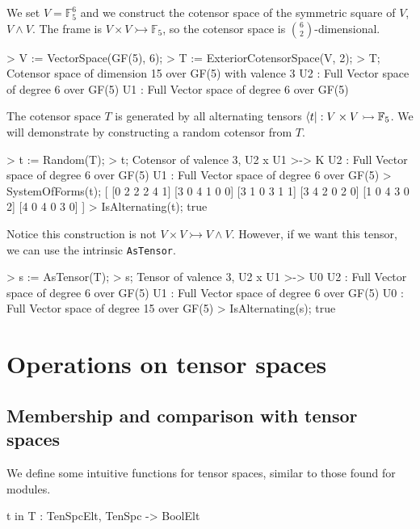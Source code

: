 \begin{example}[StandardCoTenSubspcs]

We set $V=\mathbb{F}_5^6$ and we construct the cotensor space of the symmetric square of $V$, $V\wedge V$. 
The frame is $V\times V\rightarrowtail \mathbb{F}_5$, so the cotensor space is $\binom{6}{2}$-dimensional. 
\begin{code}
> V := VectorSpace(GF(5), 6);
> T := ExteriorCotensorSpace(V, 2);
> T;
Cotensor space of dimension 15 over GF(5) with valence 3
U2 : Full Vector space of degree 6 over GF(5)
U1 : Full Vector space of degree 6 over GF(5)
\end{code}

The cotensor space $T$ is generated by all alternating tensors $\langle t| : V\times V\rightarrowtail \mathbb{F}_5$.
We will demonstrate by constructing a random cotensor from $T$. 
\begin{code}
> t := Random(T);
> t;
Cotensor of valence 3, U2 x U1 >-> K
U2 : Full Vector space of degree 6 over GF(5)
U1 : Full Vector space of degree 6 over GF(5)
> SystemOfForms(t);
[
    [0 2 2 2 4 1]
    [3 0 4 1 0 0]
    [3 1 0 3 1 1]
    [3 4 2 0 2 0]
    [1 0 4 3 0 2]
    [4 0 4 0 3 0]
]
> IsAlternating(t);
true
\end{code}

Notice this construction is not $V\times V\rightarrowtail V\wedge V$. 
However, if we want this tensor, we can use the intrinsic \texttt{AsTensor}.
\begin{code}
> s := AsTensor(T);
> s;
Tensor of valence 3, U2 x U1 >-> U0
U2 : Full Vector space of degree 6 over GF(5)
U1 : Full Vector space of degree 6 over GF(5)
U0 : Full Vector space of degree 15 over GF(5)
> IsAlternating(s);
true
\end{code}
\end{example}


\section{Operations on tensor spaces}

\subsection{Membership and comparison with tensor spaces}

We define some intuitive functions for tensor spaces, similar to those found for modules.

\begin{intrinsics}
t in T : TenSpcElt, TenSpc -> BoolElt
\end{intrinsics}

